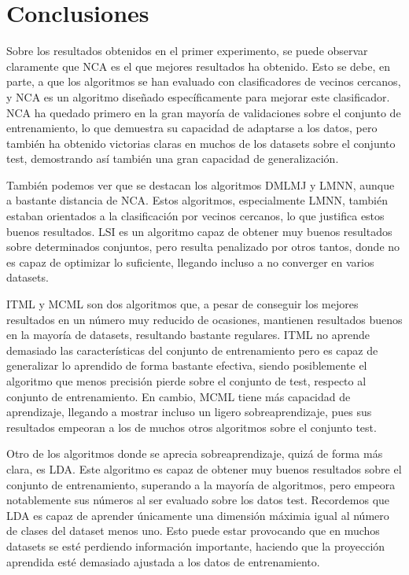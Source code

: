 \section{Conclusiones}

Sobre los resultados obtenidos en el primer experimento, se puede observar claramente que NCA es el que mejores resultados ha obtenido. Esto se debe, en parte, a que los algoritmos se han evaluado con clasificadores de vecinos cercanos, y NCA es un algoritmo diseñado específicamente para mejorar este clasificador. NCA ha quedado primero en la gran mayoría de validaciones sobre el conjunto de entrenamiento, lo que demuestra su capacidad de adaptarse a los datos, pero también ha obtenido victorias claras en muchos de los datasets sobre el conjunto test, demostrando así también una gran capacidad de generalización.

También podemos ver que se destacan los algoritmos DMLMJ y LMNN, aunque a bastante distancia de NCA. Estos algoritmos, especialmente LMNN, también estaban orientados a la clasificación por vecinos cercanos, lo que justifica estos buenos resultados.  LSI es un algoritmo capaz de obtener muy buenos resultados sobre determinados conjuntos, pero resulta penalizado por otros tantos, donde no es capaz de optimizar lo suficiente, llegando incluso a no converger en varios datasets.

ITML y MCML son dos algoritmos que, a pesar de conseguir los mejores resultados en un número muy reducido de ocasiones, mantienen resultados buenos en la mayoría de datasets, resultando bastante regulares. ITML no aprende demasiado las características del conjunto de entrenamiento pero es capaz de generalizar lo aprendido de forma bastante efectiva, siendo posiblemente el algoritmo que menos precisión pierde sobre el conjunto de test, respecto al conjunto de entrenamiento. En cambio, MCML tiene más capacidad de aprendizaje, llegando a mostrar incluso un ligero sobreaprendizaje, pues sus resultados empeoran a los de muchos otros algoritmos sobre el conjunto test.

Otro de los algoritmos donde se aprecia sobreaprendizaje, quizá de forma más clara, es LDA. Este algoritmo es capaz de obtener muy buenos resultados sobre el conjunto de entrenamiento, superando a la mayoría de algoritmos, pero empeora notablemente sus números al ser evaluado sobre los datos test. Recordemos que LDA es capaz de aprender únicamente una dimensión máximia igual al número de clases del dataset menos uno. Esto puede estar provocando que en muchos datasets se esté perdiendo información importante, haciendo que la proyección aprendida esté demasiado ajustada a los datos de entrenamiento.

